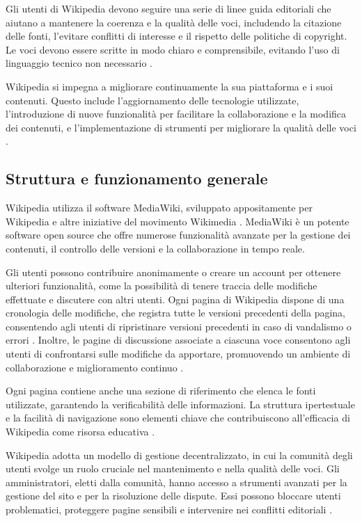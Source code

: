 \documentclass[12pt,a4paper]{report}
\begin{document}
Gli utenti di Wikipedia devono seguire una serie di linee guida editoriali che aiutano a mantenere la coerenza e la qualità delle voci, includendo la citazione delle fonti, l'evitare conflitti di interesse e il rispetto delle politiche di copyright. Le voci devono essere scritte in modo chiaro e comprensibile, evitando l'uso di linguaggio tecnico non necessario \cite{reagle2010good}.

Wikipedia si impegna a migliorare continuamente la sua piattaforma e i suoi contenuti. Questo include l'aggiornamento delle tecnologie utilizzate, l'introduzione di nuove funzionalità per facilitare la collaborazione e la modifica dei contenuti, e l'implementazione di strumenti per migliorare la qualità delle voci \cite{history_of_wikis}.

\subsection{Struttura e funzionamento generale}

Wikipedia utilizza il software MediaWiki, sviluppato appositamente per Wikipedia e altre iniziative del movimento Wikimedia \cite{denning2005wikipedia}. MediaWiki è un potente software open source che offre numerose funzionalità avanzate per la gestione dei contenuti, il controllo delle versioni e la collaborazione in tempo reale.

Gli utenti possono contribuire anonimamente o creare un account per ottenere ulteriori funzionalità, come la possibilità di tenere traccia delle modifiche effettuate e discutere con altri utenti. Ogni pagina di Wikipedia dispone di una cronologia delle modifiche, che registra tutte le versioni precedenti della pagina, consentendo agli utenti di ripristinare versioni precedenti in caso di vandalismo o errori \cite{wikiwikiweb}. Inoltre, le pagine di discussione associate a ciascuna voce consentono agli utenti di confrontarsi sulle modifiche da apportare, promuovendo un ambiente di collaborazione e miglioramento continuo \cite{jemielniak2014wikipedia}.

Ogni pagina contiene anche una sezione di riferimento che elenca le fonti utilizzate, garantendo la verificabilità delle informazioni. La struttura ipertestuale e la facilità di navigazione sono elementi chiave che contribuiscono all'efficacia di Wikipedia come risorsa educativa \cite{reagle2010good}.

Wikipedia adotta un modello di gestione decentralizzato, in cui la comunità degli utenti svolge un ruolo cruciale nel mantenimento e nella qualità delle voci. Gli amministratori, eletti dalla comunità, hanno accesso a strumenti avanzati per la gestione del sito e per la risoluzione delle dispute. Essi possono bloccare utenti problematici, proteggere pagine sensibili e intervenire nei conflitti editoriali \cite{denning2005wikipedia}.
\end{document}
